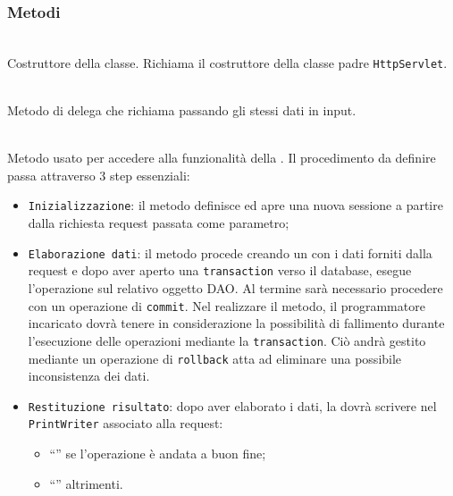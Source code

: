 \subsubsection*{Metodi}
\begin{description}
	\item{}\\
	Costruttore della classe. Richiama il costruttore della classe padre \texttt{HttpServlet}.
	
	\item{}\\
	Metodo di delega che richiama  passando gli stessi dati in input.
	
	\item{}\\
	Metodo usato per accedere alla funzionalità della . Il procedimento da definire passa attraverso 3 step essenziali:
	\begin{itemize}
		\item \texttt{Inizializzazione}: il metodo definisce ed apre una nuova sessione a partire dalla richiesta request passata come parametro;
		\item \texttt{Elaborazione dati}: il metodo procede creando un  con i dati forniti dalla request e dopo aver aperto una \texttt{transaction} verso il database, esegue l'operazione  sul relativo oggetto DAO. Al termine sarà necessario procedere con un operazione di \texttt{commit}. Nel realizzare il metodo, il programmatore incaricato dovrà tenere in considerazione la possibilità di fallimento durante l'esecuzione delle operazioni mediante la \texttt{transaction}. Ciò andrà gestito mediante un operazione di \texttt{rollback} atta ad eliminare una possibile inconsistenza dei dati.
		\item \texttt{Restituzione risultato}: dopo aver elaborato i dati, la  dovrà scrivere nel \texttt{PrintWriter} associato alla request:
			\begin{itemize}
				\item ``'' se l'operazione è andata a buon fine;
				\item ``'' altrimenti.
			\end{itemize}
	\end{itemize}

\end{description}

